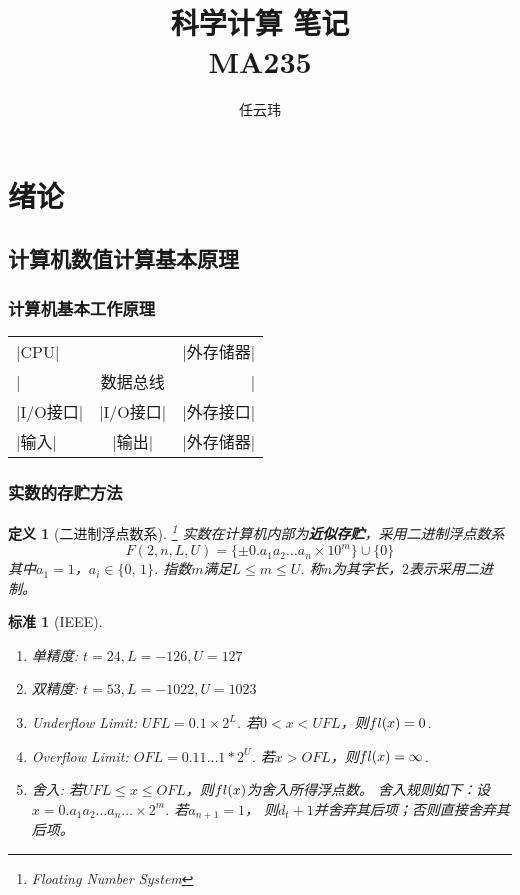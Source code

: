 \documentclass[12pt, a4paper]{article}
\title{科学计算 笔记\\MA235}
\author{任云玮}
\date{}
\theoremstyle{margin}
\newtheorem{defi}[thm]{定义}
\newtheorem{std}[thm]{标准}
\newcommand{\tbf}{\textbf}
\newcommand{\fl}{\mathnormal{fl}}
\newcommand{\aoneton}{a_1a_2\dots a_n}
\begin{document}
\maketitle
\tableofcontents
\newpage

\section{绪论}

\subsection{计算机数值计算基本原理}

\subsubsection{计算机基本工作原理}
  \begin{tabular}{lcr}
    |CPU| &  & |外存储器| \\
    | & 数据总线 & | \\
    |I/O接口| & |I/O接口| & |外存接口| \\
    |输入|    & |输出|    & |外存储器|
  \end{tabular}

\subsubsection{实数的存贮方法}
  \begin{defi}[二进制浮点数系]\footnote{Floating Number System}
    实数在计算机内部为\tbf{近似存贮}，采用二进制浮点数系
    \[
      F(2,n,L,U)=\{\pm0.\aoneton\times10^m\}\cup\{0\}
    \]
    其中$a_1=1$，$a_i\in\{0,\,1\}$. 指数$m$满足$L\le m\le U$.
    称$n$为其字长，$2$表示采用二进制。
  \end{defi}

  \begin{std}[IEEE]
    $\,$
    \begin{enumerate}
      \item 单精度: $t=24,L=-126,U=127$
      \item 双精度: $t=53,L=-1022,U=1023$
      \item Underflow Limit: $UFL=0.1\times2^L$.
      若$0<x<UFL$，则$\fl(x)=0$.
      \item Overflow Limit: $OFL=0.11\dots1*2^U$.
      若$x>OFL$，则$\fl(x)=\infty$.
      \item 舍入: 若$UFL\le x\le OFL$，则$\fl(x)$为舍入所得浮点数。
      舍入规则如下：设$x=0.\aoneton\dots\times2^m$. 若$a_{n+1}=1$，
      则$d_t+1$并舍弃其后项；否则直接舍弃其后项。
    \end{enumerate}
  \end{std}
\end{document}
